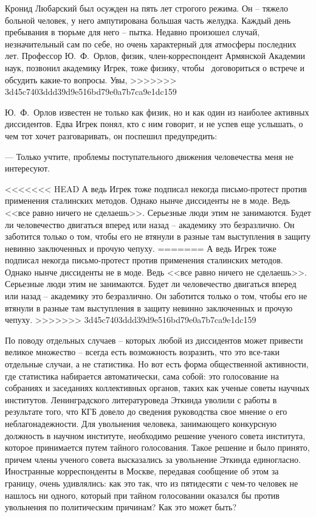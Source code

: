 \documentclass{book}
\begin{document}
Кронид Любарский был осужден на пять лет строгого ре­жима. Он -- тяжело больной человек, у него ампутирована большая часть желудка. Каждый день пребывания в тюрьме для него -- пытка.
Недавно произошел случай, незначительный сам по себе, но очень характерный для атмосферы последних лет. Профес­сор Ю.~Ф.~Орлов, физик, член-корреспондент Армянской Академии наук, позвонил академику Игрек, тоже физику, чтобы  договориться о встрече и обсудить какие-то вопросы. Увы,
>>>>>>> 3d45c7403ddd39d9e516bd79e0a7b7ca9e1dc159

Ю.~Ф.~Орлов известен не только как физик, но и как один из наиболее активных диссидентов. Едва Игрек понял, кто с ним говорит, и не успев еще услышать, о чем тот хочет разговаривать, он поспешил предупредить:

--- Только учтите, проблемы поступательного движения человечества меня не интересуют.

<<<<<<< HEAD
А ведь Игрек тоже подписал некогда письмо‑протест против применения сталинских методов. Однако нынче диссиденты не в моде. Ведь <<все равно ничего не сделаешь>>. Серьезные люди этим не занимаются. Будет ли человечество двигаться вперед или назад -- академику это безразлично. Он заботится только о том, чтобы его не втянули в разные там выступления в защиту невинно заключенных и прочую чепуху.
=======
А ведь Игрек тоже подписал некогда письмо-протест против применения сталинских методов. Однако нынче диссиденты не в моде. Ведь <<все равно ничего не сделаешь>>. Серьезные люди этим не занимаются. Будет ли человечество двигаться вперед или назад -- академику это безразлично. Он заботится только о том, чтобы его не втянули в разные там выступления в защиту невинно заключенных и прочую чепуху.
>>>>>>> 3d45c7403ddd39d9e516bd79e0a7b7ca9e1dc159

По поводу отдельных случаев -- которых любой из диссидентов может привести великое множество -- всегда есть возможность возразить, что это все-таки отдельные случаи, а не статистика. Но вот есть форма общественной активности, где статистика набирается автоматически, сама собой: это голосование на собраниях и заседаниях коллективных органов, таких как ученые советы научных институтов. Ленинградского литературоведа Эткинда уволили с работы в результате того, что КГБ довело до сведения руководства свое мнение о его неблагонадежности. Для увольнения человека, занимающего конкурсную должность в научном институте, необходимо решение ученого совета института, которое принимается путем тайного голосования. Такое решение и было принято, причем члены ученого совета высказались за увольнение Эткинда единогласно.  Иностранные корреспонденты в Москве, передавая сообщение об этом за границу, очень удивлялись: как это так, что из пятидесяти с чем-то человек не нашлось ни одного, кото­рый при тайном голосовании  оказался бы 
против увольнения по политическим причинам? Как это может быть?
\end{document}
